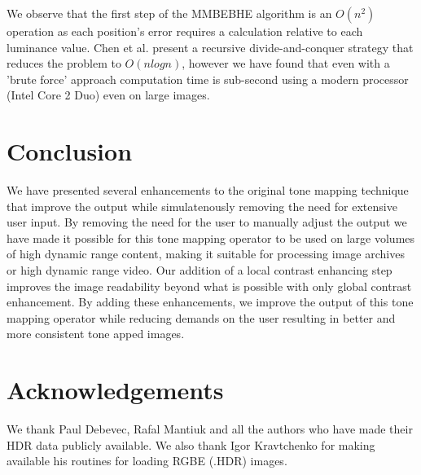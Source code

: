 \documentclass[twocolumn]{article}
\begin{document}
We observe that the first step of the MMBEBHE algorithm is an $O(n^2)$ operation as each position's error requires a calculation relative to each luminance value. Chen et al. present a recursive divide-and-conquer strategy that reduces the problem to $O(n log n)$, however we have found that even with a 'brute force' approach computation time is sub-second using a modern processor (Intel Core 2 Duo) even on large images.

\section{Conclusion}

We have presented several enhancements to the original tone mapping technique that improve the output while simulatenously removing the need for extensive user input. By removing the need for the user to manually adjust the output we have made it possible for this tone mapping operator to be used on large volumes of high dynamic range content, making it suitable for processing image archives or high dynamic range video. Our addition of a local contrast enhancing step improves the image readability beyond what is possible with only global contrast enhancement. By adding these enhancements, we improve the output of this tone mapping operator while reducing demands on the user resulting in better and more consistent tone apped images.

\section{Acknowledgements}

We thank Paul Debevec, Rafal Mantiuk and all the authors who have made their HDR data publicly available. We also thank Igor Kravtchenko for making available his routines for loading RGBE (.HDR) images.

\pagebreak[4]
{}

\end{document}

